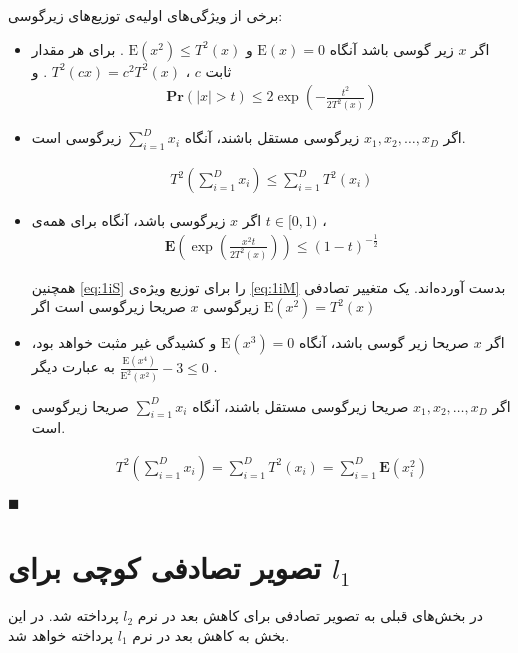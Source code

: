 برخی از ویژگی‌های اولیه‌ی توزیع‌های زیرگوسی:

\begin{itemize}
\item
اگر 
$x$
زیر گوسی باشد آنگاه 
$\mathrm{E}(x) = 0$
و 
$\mathrm{E}(x^2) \leq T^2(x)$
. برای هر مقدار ثابت 
$c$
، 
$T^2(cx) = c^2T^2(x)$
. و
\begin{align}
\mathbf{Pr}(|x| > t) \leq 2 \exp \left( - \frac{t^2}{2T^2(x)} \right)
\label{eq:1iQ}
\end{align}
\item
اگر 
$x_1, x_2, \ldots, x_D$
زیرگوسی مستقل باشند، آنگاه
$\sum_{i=1}^D x_i$
زیرگوسی است.

\begin{align}
T^2 \left( \sum_{i=1}^D x_i \right) \leq \sum_{i=1}^D T^2(x_i)
\label{eq:1iR.0}
\end{align}
\item
اگر 
$x$
زیرگوسی باشد، آنگاه برای همه‌ی 
$t \in [0,1)$
،
\begin{align}
\mathbf{E} \left( \exp \left( \frac{x^2 t}{2 T^2(x)} \right) \right) \leq (1-t)^{- \frac{1}{2}}
\label{eq:1iS}
\end{align}

\cite{litez2, litez3}
همچنین 
\autoref{eq:1iS}
را برای توزیع ویژه‌ی
\autoref{eq:1iM}
بدست آورده‌اند. یک متغییر تصادفی زیرگوسی
$x$
صریحا زیرگوسی است اگر 
$\mathrm{E}(x^2) = T^2(x)$
\item
اگر 
$x$
صریحا زیر گوسی باشد، آنگاه 
‌$\mathrm{E}(x^3)=0$
و کشیدگی%
غیر مثبت خواهد بود، به عبارت دیگر 
$\frac{\mathrm{E}(x^4)}{\mathrm{E}^2(x^2)} - 3 \leq 0$
.
\item
اگر
$x_1, x_2, \ldots, x_D$
صریحا زیرگوسی مستقل باشند، آنگاه
$\sum_{i=1}^D x_i$
صریحا زیرگوسی است.

\begin{align}
T^2 \left( \sum_{i=1}^D x_i \right) = \sum_{i=1}^D T^2(x_i)
= \sum_{i=1}^D \mathbf{E} \left( x_i^2 \right)
\label{eq:1iR.1}
\end{align}
\end{itemize}

$\blacksquare$
\bigskip


\section{
تصویر تصادفی کوچی برای 
$l_1$
}
در بخش‌های قبلی به تصویر تصادفی برای کاهش بعد در نرم 
$l_2$
پرداخته شد. در این بخش به کاهش بعد در نرم
$l_1$
پرداخته خواهد شد. 

